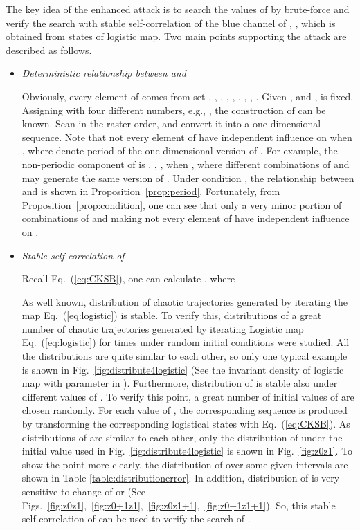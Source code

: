 \documentclass[twocolumn]{svjour3}
\begin{document}
The key idea of the enhanced attack is to search the values of  by brute-force
and verify the search with stable self-correlation of the blue channel of , ,
which is obtained from states of logistic map. Two main points supporting the attack are described as follows.
\begin{itemize}
\item \textit{Deterministic relationship between  and }

Obviously, every element of  comes from set ,
 , 
,
, , , , ,
. Given ,  and ,  is fixed. Assigning 
with four different numbers, e.g., , the construction of  can be known. Scan  in the raster order, and convert it into a one-dimensional sequence. Note that not every element of  have independent influence on  when , where
 denote period of the one-dimensional version of . For example, the non-periodic component of  is
, , ,  when ,
where different combinations of  and  may generate the same version of .
Under condition , the relationship between  and  is shown in Proposition~\ref{prop:period}. Fortunately, from Proposition~\ref{prop:condition}, one can see that only a
very minor portion of combinations of  and  making not every element of  have independent influence on .

\item \textit{Stable self-correlation of }

Recall Eq.~(\ref{eq:CKSB}), one can calculate , where

As well known, distribution of chaotic trajectories generated by iterating the map Eq.~(\ref{eq:logistic}) is stable. To verify this,
distributions of a great number of chaotic trajectories generated by iterating Logistic map Eq.~(\ref{eq:logistic}) for  times under random initial conditions were
studied. All the distributions are quite similar to each other, so only one typical example is shown in Fig.~\ref{fig:distribute4logistic}
(See the invariant density of logistic map with parameter  in \cite[Fig.~2]{Oteo:DoublePlogistic:PRE07}). Furthermore, distribution of  is stable also under different values of . To verify this point, a great number of initial values of  are chosen randomly. For each value of , the corresponding
sequence  is produced by transforming the corresponding logistical states with Eq.~(\ref{eq:CKSB}). As distributions of  are similar to each other, only the distribution of  under the initial value used in Fig.~\ref{fig:distribute4logistic} is shown in Fig.~\ref{fig:z0z1}. To show the point more clearly, the distribution of  over some given intervals are shown in
Table \ref{table:distributionerror}. In addition,
distribution of  is very sensitive to change of  or  (See Figs.~\ref{fig:z0z1},~\ref{fig:z0+1z1},~\ref{fig:z0z1+1},~\ref{fig:z0+1z1+1}).
So, this stable self-correlation of  can be used to verify the search of .
\end{itemize}
\end{document}
